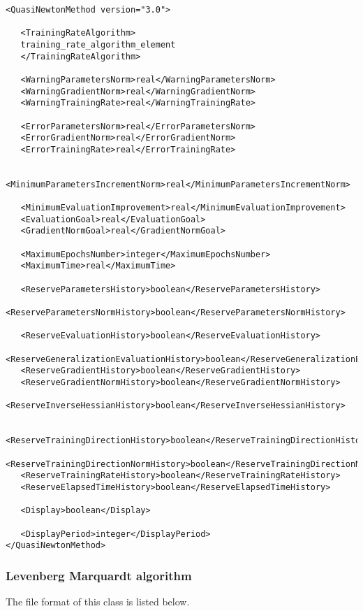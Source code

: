 \begin{lstlisting}
<QuasiNewtonMethod version="3.0">

   <TrainingRateAlgorithm>
   training_rate_algorithm_element
   </TrainingRateAlgorithm>
   
   <WarningParametersNorm>real</WarningParametersNorm>
   <WarningGradientNorm>real</WarningGradientNorm>
   <WarningTrainingRate>real</WarningTrainingRate>
   
   <ErrorParametersNorm>real</ErrorParametersNorm>
   <ErrorGradientNorm>real</ErrorGradientNorm>   
   <ErrorTrainingRate>real</ErrorTrainingRate>
   
   <MinimumParametersIncrementNorm>real</MinimumParametersIncrementNorm>
   
   <MinimumEvaluationImprovement>real</MinimumEvaluationImprovement>
   <EvaluationGoal>real</EvaluationGoal>
   <GradientNormGoal>real</GradientNormGoal>
   
   <MaximumEpochsNumber>integer</MaximumEpochsNumber>
   <MaximumTime>real</MaximumTime>
   
   <ReserveParametersHistory>boolean</ReserveParametersHistory>
   <ReserveParametersNormHistory>boolean</ReserveParametersNormHistory>
   
   <ReserveEvaluationHistory>boolean</ReserveEvaluationHistory>
   <ReserveGeneralizationEvaluationHistory>boolean</ReserveGeneralizationEvaluationHistory>
   <ReserveGradientHistory>boolean</ReserveGradientHistory>   
   <ReserveGradientNormHistory>boolean</ReserveGradientNormHistory>
   <ReserveInverseHessianHistory>boolean</ReserveInverseHessianHistory>
   
   <ReserveTrainingDirectionHistory>boolean</ReserveTrainingDirectionHistory>
   <ReserveTrainingDirectionNormHistory>boolean</ReserveTrainingDirectionNormHistory>
   <ReserveTrainingRateHistory>boolean</ReserveTrainingRateHistory>
   <ReserveElapsedTimeHistory>boolean</ReserveElapsedTimeHistory>
   
   <Display>boolean</Display>
   
   <DisplayPeriod>integer</DisplayPeriod>
</QuasiNewtonMethod>
\end{lstlisting}

\subsubsection*{Levenberg Marquardt algorithm}

The file format of this class is listed below. 


